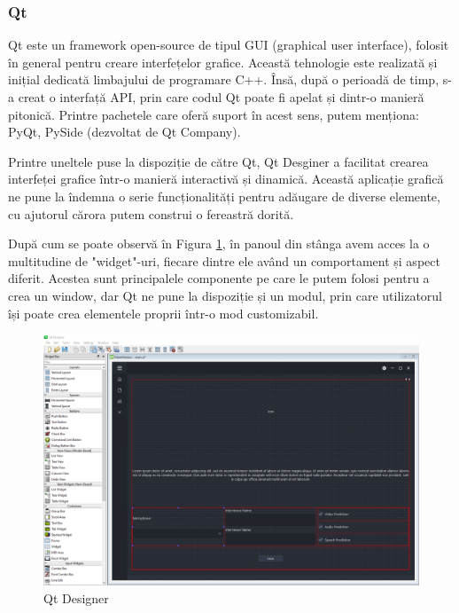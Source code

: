 \documentclass[a4paper, 12pt]{report}
\begin{document}
	\subsubsection{Qt}
 	Qt \cite{qt} este un framework open-source de tipul GUI (graphical user interface), folosit în general pentru creare interfețelor grafice. Această tehnologie este realizată și inițial dedicată limbajului de programare C++. Însă, după o perioadă de timp, s-a creat o interfață API, prin care codul Qt poate fi apelat și dintr-o manieră pitonică. Printre pachetele care oferă suport în acest sens, putem menționa: PyQt, PySide (dezvoltat de Qt Company). 
 
 	Printre uneltele puse la dispoziție de către Qt, Qt Desginer a facilitat crearea interfeței grafice într-o manieră interactivă și 	 dinamică. Această aplicație grafică ne pune la îndemna o serie funcționalități pentru adăugare de diverse elemente, cu ajutorul cărora putem construi o fereastră dorită. 
 	
 	După cum se poate observă în Figura \ref{fig:qt_designer}, în panoul din stânga avem acces la o multitudine de "widget"-uri, fiecare dintre ele având un comportament și aspect diferit. Acestea sunt principalele componente pe care le putem folosi pentru a crea un window, dar Qt ne pune la dispoziție și un modul, prin care utilizatorul își poate crea elementele proprii într-o mod customizabil.
	
	\begin{figure}[H]
		\begin{center}
			\includegraphics[scale=0.3]{images/qt_designer.png}
		\end{center}
		\caption{Qt Designer}
		\label{fig:qt_designer}
	\end{figure} 
\end{document}
